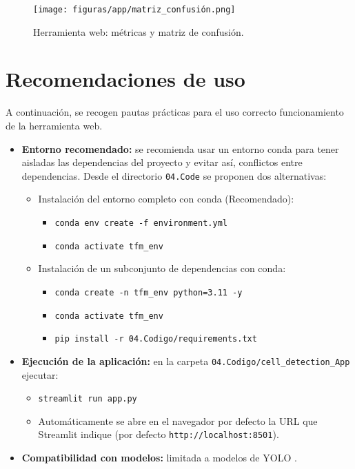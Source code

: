 \documentclass[12pt,a4paper,onecolumn,oneside]{report}
\begin{document}
\begin{figure}[htbp]
  \centering
  \texttt{[image: figuras/app/matriz\_confusión.png]}
  \caption{Herramienta web: métricas y matriz de confusión.}
  \label{fig:cell_app_metrics}
\end{figure}

\section{Recomendaciones de uso}
\label{sec:Recomendaciones de uso}
A continuación, se recogen pautas prácticas para el uso correcto funcionamiento de la herramienta web.

\begin{itemize}
  \item \textbf{Entorno recomendado:} se recomienda usar un entorno conda para tener aisladas las dependencias del proyecto y evitar así, conflictos entre dependencias. 
  Desde el directorio \texttt{04.Code} se proponen dos alternativas:
    \begin{itemize}
      \item Instalación del entorno completo con conda (Recomendado):
        \begin{itemize}
          \item \texttt{conda env create -f environment.yml}
          \item \texttt{conda activate tfm\_env}
        \end{itemize}
      \item Instalación de un subconjunto de dependencias con conda:
        \begin{itemize}
          \item \texttt{conda create -n tfm\_env python=3.11 -y}
          \item \texttt{conda activate tfm\_env}
          \item \texttt{pip install -r 04.Codigo/requirements.txt}
        \end{itemize}
    \end{itemize}
  \item \textbf{Ejecución de la aplicación:} en la carpeta \texttt{04.Codigo/cell\_detection\_App} ejecutar:
    \begin{itemize}
      \item \texttt{streamlit run app.py}
      \item Automáticamente se abre en el navegador por defecto la URL que Streamlit indique (por defecto \texttt{http://localhost:8501}).
    \end{itemize}
  \item \textbf{Compatibilidad con modelos:} limitada a modelos de YOLO \cite{ultralytics_models}. 
\end{itemize}
\end{document}
